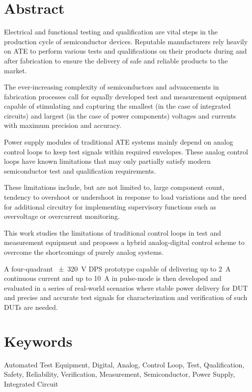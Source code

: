 

\begin{flushleft}
    \section*{\textbf{Abstract}}
    \justifying
    \vskip 1cm

    Electrical and functional testing and qualification are vital steps in
    the production cycle of semiconductor devices. Reputable manufacturers
    rely heavily on \acs{ATE} to perform various tests and qualifications on
    their products during and after fabrication to ensure the delivery of
    safe and reliable products to the market.

    The ever-increasing complexity of semiconductors and advancements in
    fabrication processes call for equally developed test and measurement
    equipment capable of stimulating and capturing the smallest (in the case
    of integrated circuits) and largest (in the case of power components)
    voltages and currents with maximum precision and accuracy.

    Power supply modules of traditional ATE systems mainly depend on analog
    control loops to keep test signals within required envelopes.
    These analog control loops have known limitations that may only
    partially satisfy modern semiconductor test and qualification
    requirements.

    These limitations include, but are not limited to, large component
    count, tendency to overshoot or undershoot in response to load
    variations and the need for additional circuitry for implementing
    supervisory functions such as overvoltage or overcurrent monitoring.

    This work studies the limitations of traditional control loops in test
    and measurement equipment and proposes a hybrid analog-digital control
    scheme to overcome the shortcomings of purely analog
    systems.

    A four-quadrant \SI{\pm320}{\volt} \acs{DPS} prototype
    capable of delivering up to \SI{2}{\ampere} continuous current
    and up to \SI{10}{\ampere} in pulse-mode is then developed and
    evaluated in a series of real-world scenarios where stable power delivery
    for \acs{DUT} and precise and accurate test signals for
    characterization and verification of such \acs{DUT}s are needed.


    \vskip 0.45cm
    \section*{\textbf{Keywords}}
    {
    Automated Test Equipment, Digital, Analog, Control Loop, Test, Qualification,
    Safety, Reliability, Verification, Measurement, Semiconductor, Power Supply,
    Integrated Circuit
    \par}

\end{flushleft}

